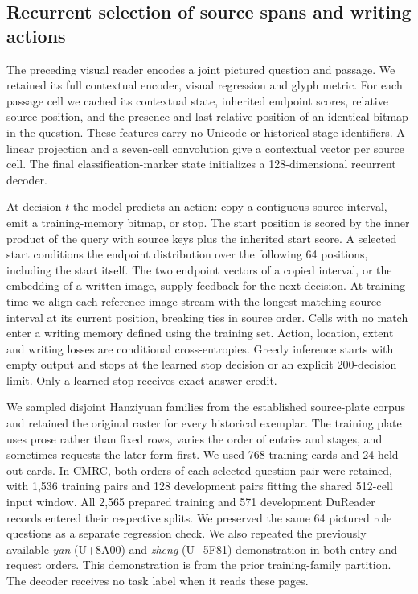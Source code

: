 \documentclass[12pt,a4paper]{article}
\providecommand{\DIFadd}[1]{{\protect\color{blue} \sf #1}} %
\begin{document}
\subsection*{\DIFadd{Recurrent selection of source spans and writing actions}}
\DIFadd{The preceding visual reader encodes a joint pictured question and passage. We retained its full contextual encoder, visual regression and glyph metric. For each passage cell we cached its contextual state, inherited endpoint scores, relative source position, and the presence and last relative position of an identical bitmap in the question. These features carry no Unicode or historical stage identifiers. A linear projection and a seven-cell convolution give a contextual vector per source cell. The final classification-marker state initializes a 128-dimensional recurrent decoder.
}

\DIFadd{At decision $t$ the model predicts an action: copy a contiguous source interval, emit a training-memory bitmap, or stop. The start position is scored by the inner product of the query with source keys plus the inherited start score. A selected start conditions the endpoint distribution over the following 64 positions, including the start itself. The two endpoint vectors of a copied interval, or the embedding of a written image, supply feedback for the next decision. At training time we align each reference image stream with the longest matching source interval at its current position, breaking ties in source order. Cells with no match enter a writing memory defined using the training set. Action, location, extent and writing losses are conditional cross-entropies. Greedy inference starts with empty output and stops at the learned stop decision or an explicit 200-decision limit. Only a learned stop receives exact-answer credit.
}

\DIFadd{We sampled disjoint Hanziyuan families from the established source-plate corpus and retained the original raster for every historical exemplar. The training plate uses prose rather than fixed rows, varies the order of entries and stages, and sometimes requests the later form first. We used 768 training cards and 24 held-out cards. In CMRC, both orders of each selected question pair were retained, with 1,536 training pairs and 128 development pairs fitting the shared 512-cell input window. All 2,565 prepared training and 571 development DuReader records entered their respective splits. We preserved the same 64 pictured role questions as a separate regression check. We also repeated the previously available \textit{yan} (U+8A00) and \textit{zheng} (U+5F81) demonstration in both entry and request orders. This demonstration is from the prior training-family partition. The decoder receives no task label when it reads these pages.
}
\end{document}
